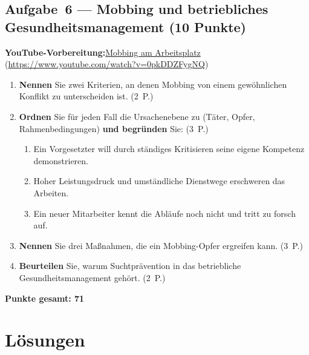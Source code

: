 \documentclass[11pt, a4paper]{article}
\begin{document}
\subsection*{Aufgabe~6 --- Mobbing und betriebliches Gesundheitsmanagement (10 Punkte)}

\noindent\textbf{\color{bfwAccent}YouTube-Vorbereitung:}\enspace \href{https://www.youtube.com/watch?v=0pkDDZFygNQ}{Mobbing am Arbeitsplatz} (\url{https://www.youtube.com/watch?v=0pkDDZFygNQ})

\medskip
\begin{enumerate}[label=(\alph*)]
  \item \textbf{Nennen} Sie zwei Kriterien, an denen Mobbing von einem gewöhnlichen Konflikt zu unterscheiden ist. \hfill (2~P.)
  \item \textbf{Ordnen} Sie für jeden Fall die Ursachenebene zu (Täter, Opfer, Rahmenbedingungen) \textbf{und begründen} Sie: \hfill (3~P.)
    \begin{enumerate}[label=\arabic*., leftmargin=*]
      \item Ein Vorgesetzter will durch ständiges Kritisieren seine eigene Kompetenz demonstrieren.
      \item Hoher Leistungsdruck und umständliche Dienstwege erschweren das Arbeiten.
      \item Ein neuer Mitarbeiter kennt die Abläufe noch nicht und tritt zu forsch auf.
    \end{enumerate}
  \item \textbf{Nennen} Sie drei Maßnahmen, die ein Mobbing-Opfer ergreifen kann. \hfill (3~P.)
  \item \textbf{Beurteilen} Sie, warum Suchtprävention in das betriebliche Gesundheitsmanagement gehört. \hfill (2~P.)
\end{enumerate}

\vspace{1em}
\noindent\textbf{Punkte gesamt: 71}

\newpage

\section{Lösungen}\label{loesungen}
\end{document}
